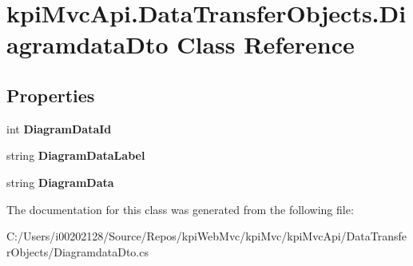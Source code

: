 \hypertarget{classkpi_mvc_api_1_1_data_transfer_objects_1_1_diagramdata_dto}{}\section{kpi\+Mvc\+Api.\+Data\+Transfer\+Objects.\+Diagramdata\+Dto Class Reference}
\label{classkpi_mvc_api_1_1_data_transfer_objects_1_1_diagramdata_dto}
\subsection*{Properties}
\begin{DoxyCompactItemize}
\item 
\mbox{\label{classkpi_mvc_api_1_1_data_transfer_objects_1_1_diagramdata_dto_a2f1c78c25410b5d89692f417c0099414}} 
int {\bfseries Diagram\+Data\+Id}
\item 
\mbox{\label{classkpi_mvc_api_1_1_data_transfer_objects_1_1_diagramdata_dto_a5cb8e04b29f5c657d4185b426eeb84da}} 
string {\bfseries Diagram\+Data\+Label}
\item 
\mbox{\label{classkpi_mvc_api_1_1_data_transfer_objects_1_1_diagramdata_dto_a4163112f5037d60673ac0d3ef3603fc8}} 
string {\bfseries Diagram\+Data}
\end{DoxyCompactItemize}


The documentation for this class was generated from the following file\+:\begin{DoxyCompactItemize}
\item 
C\+:/\+Users/i00202128/\+Source/\+Repos/kpi\+Web\+Mvc/kpi\+Mvc/kpi\+Mvc\+Api/\+Data\+Transfer\+Objects/Diagramdata\+Dto.\+cs\end{DoxyCompactItemize}
